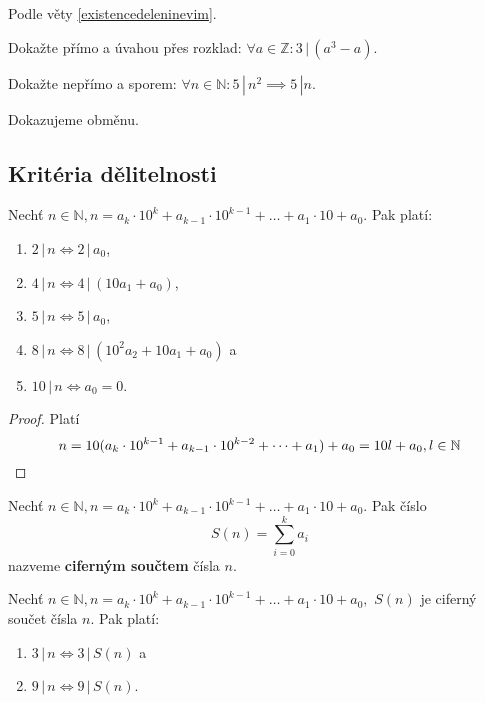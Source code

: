 \begin{reseni}
Podle věty \ref{existencedeleninevim}.
\end{reseni}

\begin{priklad}
Dokažte přímo a úvahou přes rozklad: $\forall a \in \mathbb Z: 3\, | \, (a^3-a).$
\end{priklad}

\begin{priklad}
Dokažte nepřímo a sporem: $\forall n \in \mathbb N: 5 \, | \, n^2 \implies 5 \, | n.$
\end{priklad}

\begin{reseni}
Dokazujeme obměnu.
\end{reseni}

\subsection*{Kritéria dělitelnosti}
\begin{veta}
  Nechť $n\in \mathbb N, n=a_k\cdot 10^k+a_{k-1}\cdot 10^{k-1}+\dots + a_1\cdot 10 + a_0.$ Pak platí:
  \begin{enumerate}[$i.$]
    \item $2 \, | \, n \iff 2 \, | \, a_0$,
    \item $4 \, | \, n \iff 4 \, | \, (10a_1 + a_0)$,
    \item $5 \, | \, n \iff 5 \, | \, a_0$,
    \item $8 \, | \, n \iff 8 \, | \, (10^2a_2 + 10a_1 + a_0)$ a
    \item $10 \, | \, n \iff a_0 = 0$.
  \end{enumerate}
\end{veta}

\begin{proof}
Platí
  $$n = 10(a_k\cdot 10^{k-1}+a_{k-1}\cdot 10 ^{k-2}+\dots+a_1)+a_0 = 10l+a_0, l\in \mathbb N\qedhere$$
\end{proof}

\begin{definition}
  Nechť $n\in \mathbb N, n=a_k\cdot 10^k+a_{k-1}\cdot 10^{k-1}+\dots + a_1\cdot 10 + a_0.$ Pak číslo
  $$S(n) = \sum_{i=0}^k a_i$$
  nazveme \textbf{ciferným součtem} čísla $n$.
\end{definition}

\begin{veta}
  Nechť $n\in \mathbb N, n=a_k\cdot 10^k+a_{k-1}\cdot 10^{k-1}+\dots + a_1\cdot 10 + a_0,$ $S(n)$ je ciferný součet čísla $n$. Pak platí:
  \begin{enumerate}[$i.$]
    \item $3\, | \, n \iff 3 \, | \, S(n)$ a
    \item $9\, | \, n \iff 9 \, | \, S(n)$.
  \end{enumerate}
\end{veta}

